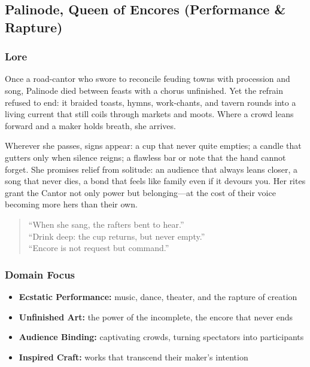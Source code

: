 
\subsection{Palinode, Queen of Encores (Performance \& Rapture)}

\subsubsection*{Lore}
Once a road-cantor who swore to reconcile feuding towns with procession and song, Palinode died between feasts with a chorus unfinished. Yet the refrain refused to end: it braided toasts, hymns, work-chants, and tavern rounds into a living current that still coils through markets and moots. Where a crowd leans forward and a maker holds breath, she arrives.

Wherever she passes, signs appear: a cup that never quite empties; a candle that gutters only when silence reigns; a flawless bar or note that the hand cannot forget. She promises relief from solitude: an audience that always leans closer, a song that never dies, a bond that feels like family even if it devours you. Her rites grant the Cantor not only power but belonging---at the cost of their voice becoming more hers than their own.

\begin{quote}
``When she sang, the rafters bent to hear.'' \\
``Drink deep: the cup returns, but never empty.'' \\
``Encore is not request but command.''
\end{quote}

\subsubsection*{Domain Focus}
\begin{itemize}
  \item \textbf{Ecstatic Performance:} music, dance, theater, and the rapture of creation
  \item \textbf{Unfinished Art:} the power of the incomplete, the encore that never ends
  \item \textbf{Audience Binding:} captivating crowds, turning spectators into participants
  \item \textbf{Inspired Craft:} works that transcend their maker's intention
\end{itemize}


